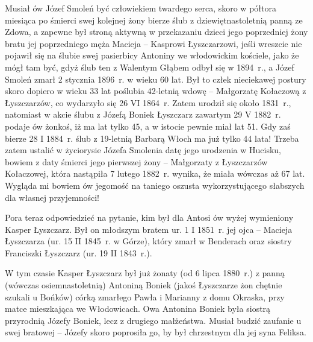 Musiał ów Józef Smoleń być człowiekiem twardego serca, skoro w półtora miesiąca po śmierci swej kolejnej żony bierze ślub z dziewiętnastoletnią panną ze Zdowa, a zapewne był stroną aktywną w przekazaniu dzieci jego poprzedniej żony bratu jej poprzedniego męża Macieja -- Kasprowi Łyszczarzowi, jeśli wreszcie nie pojawił się na ślubie swej pasierbicy Antoniny we włodowickim kościele, jako że mógł tam być, gdyż ślub ten z Walentym Głąbem odbył się w 1894~r., a Józef Smoleń zmarł 2 stycznia 1896~r. w wieku 60 lat. Był to człek nieciekawej postury skoro dopiero w wieku 33 lat poślubia 42-letnią wdowę -- Małgorzatę Kołaczową z Łyszczarzów, co wydarzyło się 26 VI 1864~r. Zatem urodził się około 1831~r., natomiast w akcie ślubu z Józefą Boniek Łyszczarz zawartym 29 V 1882~r. podaje ów żonkoś, iż ma lat tylko 45, a w istocie pewnie miał lat 51. Gdy zaś bierze 28 I 1884~r. ślub z 19-letnią Barbarą Włoch ma już tylko 44 lata! Trzeba zatem ustalić w życiorysie Józefa Smolenia datę jego urodzenia w Hucisku, bowiem z daty śmierci jego pierwszej żony -- Małgorzaty z Łyszczarzów Kołaczowej, która nastąpiła 7 lutego 1882~r. wynika, że miała wówczas aż 67 lat. Wygląda mi bowiem ów jegomość na taniego oszusta wykorzystującego słabszych dla własnej przyjemności!

Pora teraz odpowiedzieć na pytanie, kim był dla Antosi ów wyżej wymieniony Kasper Łyszczarz. Był on młodszym bratem ur. 1 I 1851~r. jej ojca -- Macieja Łyszczarza (ur. 15 II 1845~r. w Górze), który zmarł w Benderach oraz siostry Franciszki Łyszczarz (ur. 19 II 1843~r.).

W tym czasie Kasper Łyszczarz był już żonaty (od 6 lipca 1880~r.) z panną (wówczas osiemnastoletnią) Antoniną Boniek (jakoś Łyszczarze żon chętnie szukali u Bońków) córką zmarłego Pawła i Marianny z domu Okraska, przy matce mieszkająca we Włodowicach. Owa Antonina Boniek była siostrą przyrodnią Józefy Boniek, lecz z drugiego małżeństwa. Musiał budzić zaufanie u swej bratowej -- Józefy skoro poprosiła go, by był chrzestnym dla jej syna Feliksa.

